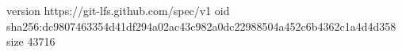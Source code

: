 version https://git-lfs.github.com/spec/v1
oid sha256:dc9807463354d41df294a02ac43c982a0dc22988504a452c6b4362c1a4d4d358
size 43716
